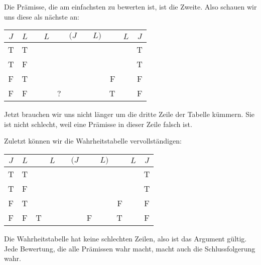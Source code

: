 Die Prämisse, die am einfachsten zu bewerten ist, ist die Zweite. Also schauen wir uns diese als nächste an:
\begin{center}
	\begin{tabular}{c c|d e e e e f |d f|c}
		$J$&$L$&\enot&$L$&\eif&$(J$&\eor&$L)$&\enot&$L$&$J$\\
		\hline
		T & T & &&&&&&&& {T}\\
		T & F & &&&&&&&& {T}\\
		F & T & &&&&&&{F}&& {F}\\
		F & F & &&?&&&&{T}&& {F}
	\end{tabular}
\end{center}
Jetzt brauchen wir uns nicht länger um die dritte Zeile der Tabelle kümmern. Sie ist nicht schlecht, weil eine Prämisse in dieser Zeile falsch ist.

Zuletzt können wir die Wahrheitstabelle vervollständigen:
\begin{center}
	\begin{tabular}{c c|d e e e e f |d f|c}
		$J$&$L$&\enot&$L$&\eif&$(J$&\eor&$L)$&\enot&$L$&$J$\\
		\hline
		T & T & &&&&&&&& {T}\\
		T & F & &&&&&&&& {T}\\
		F & T & &&&&&&{F}& & {F}\\
		F & F & T &  &  &  & F & & {T} & & {F}
	\end{tabular}
\end{center}
Die Wahrheitstabelle hat keine schlechten Zeilen, also ist das Argument gültig. Jede Bewertung, die alle Prämissen wahr macht, macht auch die Schlussfolgerung wahr.

